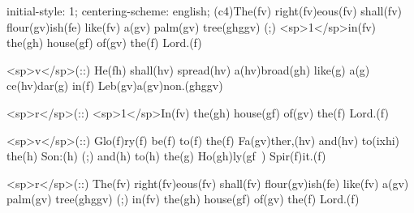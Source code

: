 initial-style: 1;
centering-scheme: english;
(c4)The(fv) right(fv)eous(fv) shall(fv) flour(gv)ish(fe) like(fv) a(gv) palm(gv) tree(ghggv) (;) <sp>1</sp>in(fv) the(gh) house(gf) of(gv) the(f) Lord.(f)

<sp>v</sp>(::) He(fh) shall(hv) spread(hv) a(hv)broad(gh) like(g) a(g) ce(hv)dar(g) in(f) Leb(gv)a(gv)non.(ghggv)

<sp>r</sp>(::) <sp>1</sp>In(fv) the(gh) house(gf) of(gv) the(f) Lord.(f)

<sp>v</sp>(::) Glo(f)ry(f) be(f) to(f) the(f) Fa(gv)ther,(hv) and(hv) to(ixhi) the(h) Son:(h) (;) and(h) to(h) the(g) Ho(gh)ly(gf~) Spir(f)it.(f)

<sp>r</sp>(::) The(fv) right(fv)eous(fv) shall(fv) flour(gv)ish(fe) like(fv) a(gv) palm(gv) tree(ghggv) (;) in(fv) the(gh) house(gf) of(gv) the(f) Lord.(f)